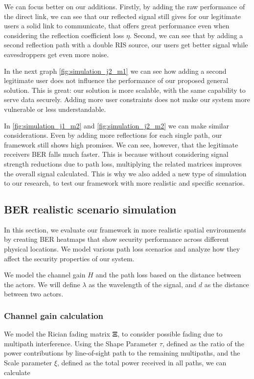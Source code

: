 We can focus better on our additions. Firstly, by adding the raw performance of the direct link, we can see that our reflected signal still gives for our legitimate users a solid link to communicate, that offers great performance even when considering the reflection coefficient loss $\eta$. Second, we can see that by adding a second reflection path with a double RIS source, our users get better signal while eavesdroppers get even more noise.

In the next graph \ref{fig:simulation_j2_m1} we can see how adding a second legitimate user does not influence the performance of our proposed general solution. This is great: our solution is more scalable, with the same capability to serve data securely. Adding more user constraints does not make our system more vulnerable or less understandable.

In \ref{fig:simulation_j1_m2} and \ref{fig:simulation_j2_m2} we can make similar considerations. Even by adding more reflections for each single path, our framework still shows high promises. We can see, however, that the legitimate receivers BER falls much faster. This is because without considering signal strength reductions due to path loss, multiplying the related matrices improves the overall signal calculated. This is why we also added a new type of simulation to our research, to test our framework with more realistic and specific scenarios.

\newpage
\subsection{BER realistic scenario simulation}

In this section, we evaluate our framework in more realistic spatial environments by creating BER heatmaps that show security performance across different physical locations. We model various path loss scenarios and analyze how they affect the security properties of our system.

We model the channel gain $H$ and the path loss based on the distance between the actors. We will define $\lambda$ as the wavelength of the signal, and $d$ as the distance between two actors.

\subsubsection{Channel gain calculation}

We model the Rician fading \cite{Rician_fading} matrix $\bm{\Xi}$, to consider possible fading due to multipath interference. Using the Shape Parameter $\tau$, defined as the ratio of the power contributions by line-of-sight path to the remaining multipaths, and the Scale parameter $\xi$, defined as the total power received in all paths, we can calculate

